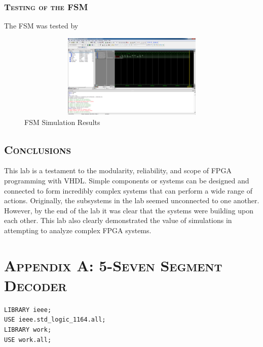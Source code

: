 \documentclass[11pt]{report}
\begin{document}
\begin{spacing}{1.5}
\subsection{\scshape Testing of the FSM}
\label{sub:test_counter}

The FSM was tested by 

\vspace{15px}
\begin{figure}[H]
    \centering
    \includegraphics[width=1.0\textwidth,height=4cm,keepaspectratio]{simulation.png}
    \caption{FSM Simulation Results}
    \label{fig:test_fsm}
\end{figure}

\section{\scshape Conclusions} %
\label{sec:conclusions}

This lab is a testament to the modularity, reliability, and scope of FPGA programming with VHDL.  Simple components or systems can be designed and connected to form incredibly complex systems that can perform a wide range of actions.  Originally, the subsystems in the lab seemed unconnected to one another.  However, by the end of the lab it was clear that the systems were building upon each other.  This lab also clearly demonstrated the value of simulations in attempting to analyze complex FPGA systems.



\clearpage

{}

\clearpage

\chapter*{\scshape Appendix A: 5-Seven Segment Decoder}
\label{app:a}

\vspace{45px}
\begin{lstlisting}
LIBRARY ieee;
USE ieee.std_logic_1164.all;
LIBRARY work;
USE work.all;


\end{lstlisting}
\end{spacing}
\end{document}
